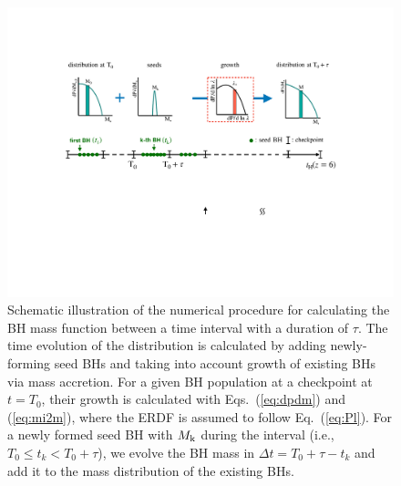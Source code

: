 \documentclass[twocolumn, twocolappendix]{aastex63}
\begin{document}
\begin{CJK*}{UTF8}{gbsn}
\begin{figure}
\centering
\includegraphics[width=170mm]{scheme1.pdf}
\caption{
Schematic illustration of the numerical procedure for calculating the BH mass function
between a time interval with a duration of $\tau$.
The time evolution of the distribution is calculated by adding newly-forming seed BHs and 
taking into account growth of existing BHs via mass accretion.
For a given BH population at a checkpoint at $t=T_0$, their growth is calculated with Eqs.~(\ref{eq:dpdm}) and (\ref{eq:mi2m}),
where the ERDF is assumed to follow Eq.~(\ref{eq:Pl}).
For a newly formed seed BH with $M_{\rm k}$ during the interval (i.e., $T_0 \leq t_k < T_0+\tau$), 
we evolve the BH mass in $\Delta t = T_0+\tau -t_k$ and add it to the mass distribution of the existing BHs.
}
\label{fig:scheme}
\vspace{8mm}
\end{figure}



\end{CJK*}
\end{document}
